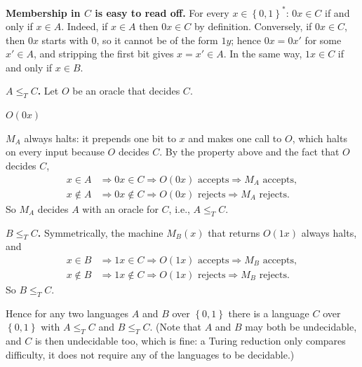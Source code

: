 \documentclass[11pt]{article}
\newcommand{\set}[1]{\left\{#1\right\}}
\newcommand{\lT}{\leq_T}
\begin{document}
\textbf{Membership in $C$ is easy to read off.}
For every $x \in \set{0,1}^*$: $0x \in C$ if and only if $x \in A$.
Indeed, if $x \in A$ then $0x \in C$ by definition.
Conversely, if $0x \in C$, then $0x$ starts with $0$, so it cannot be of the form $1y$; hence $0x = 0x'$ for some $x' \in A$, and stripping the first bit gives $x = x' \in A$.
In the same way, $1x \in C$ if and only if $x \in B$.

\textbf{$A \lT C$.}
Let $O$ be an oracle that decides $C$.

\begin{algorithmic}[1]
  \Require{A string $x \in \set{0,1}^*$}
    \State \Return $O(0x)$
  \EndFunction
\end{algorithmic}

$M_A$ always halts: it prepends one bit to $x$ and makes one call to $O$, which halts on every input because $O$ decides $C$.
By the property above and the fact that $O$ decides $C$,
\begin{align*}
  x \in A &\Longrightarrow 0x \in C \Longrightarrow O(0x) \text{ accepts} \Longrightarrow M_A \text{ accepts}, \\
  x \notin A &\Longrightarrow 0x \notin C \Longrightarrow O(0x) \text{ rejects} \Longrightarrow M_A \text{ rejects}.
\end{align*}
So $M_A$ decides $A$ with an oracle for $C$, i.e., $A \lT C$.

\textbf{$B \lT C$.}
Symmetrically, the machine $M_B(x)$ that returns $O(1x)$ always halts, and
\begin{align*}
  x \in B &\Longrightarrow 1x \in C \Longrightarrow O(1x) \text{ accepts} \Longrightarrow M_B \text{ accepts}, \\
  x \notin B &\Longrightarrow 1x \notin C \Longrightarrow O(1x) \text{ rejects} \Longrightarrow M_B \text{ rejects}.
\end{align*}
So $B \lT C$.

Hence for any two languages $A$ and $B$ over $\set{0,1}$ there is a language $C$ over $\set{0,1}$ with $A \lT C$ and $B \lT C$.
(Note that $A$ and $B$ may both be undecidable, and $C$ is then undecidable too, which is fine: a Turing reduction only compares difficulty, it does not require any of the languages to be decidable.)
\end{document}
